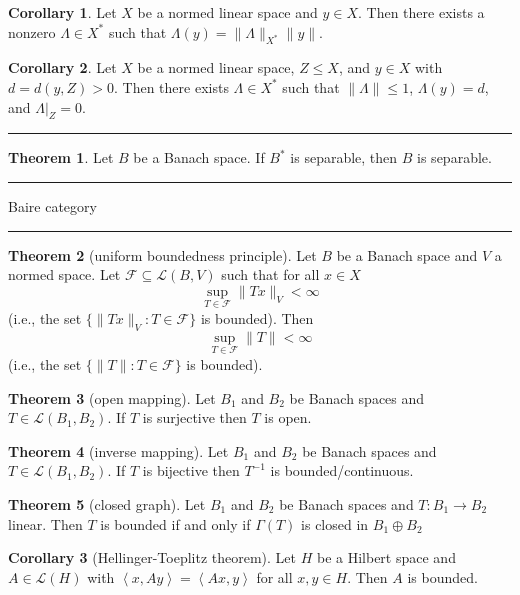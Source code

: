 \documentclass[12pt]{article}
\newcommand{\sepline}{\rule{\textwidth}{0.4pt}}
\theoremstyle{definition}
\newtheorem{theorem}{Theorem}
\newtheorem{corollary}{Corollary}
\newcommand{\LL}{\mathcal{L}}
\newcommand{\FF}{\mathcal{F}}
\newcommand{\<}{\left\langle}
\renewcommand{\>}{\right\rangle}
\newcommand{\seq}{\subseteq}
\begin{document}
\begin{corollary}
    Let $X$ be a normed linear space and $y \in X$.
    Then there exists a nonzero $\Lambda \in X^*$ such that $\Lambda(y) = \|\Lambda\|_{X^*}\|y\|$.
\end{corollary}

\begin{corollary}
    Let $X$ be a normed linear space, $Z \leq X$, and $y \in X$ with $d = d(y, Z) > 0$.
    Then there exists $\Lambda \in X^*$ such that $\|\Lambda\| \leq 1$, $\Lambda(y) = d$, and $\Lambda|_Z = 0$.
\end{corollary}

\sepline

\begin{theorem}
    Let $B$ be a Banach space.
    If $B^*$ is separable, then $B$ is separable.
\end{theorem}

\sepline

Baire category

\sepline

\begin{theorem}[uniform boundedness principle]
    Let $B$ be a Banach space and $V$ a normed space.
    Let $\FF \seq \LL(B, V)$ such that for all $x \in X$
    \[
        \sup_{T \in \FF} \|Tx\|_V < \infty
    \]
    (i.e., the set $\{\|Tx\|_V : T \in \FF\}$ is bounded).
    Then
    \[
        \sup_{T \in \FF} \|T\| < \infty
    \]
    (i.e., the set $\{\|T\| : T \in \FF\}$ is bounded).
\end{theorem}

\begin{theorem}[open mapping]
    Let $B_1$ and $B_2$ be Banach spaces and $T \in \LL(B_1, B_2)$.
    If $T$ is surjective then $T$ is open.
\end{theorem}

\begin{theorem}[inverse mapping]
    Let $B_1$ and $B_2$ be Banach spaces and $T \in \LL(B_1, B_2)$.
    If $T$ is bijective then $T^{-1}$ is bounded/continuous.
\end{theorem}

\begin{theorem}[closed graph]
    Let $B_1$ and $B_2$ be Banach spaces and $T : B_1 \to B_2$ linear.
    Then $T$ is bounded if and only if $\Gamma(T)$ is closed in $B_1 \oplus B_2$
\end{theorem}

\begin{corollary}[Hellinger-Toeplitz theorem]
    Let $H$ be a Hilbert space and $A \in \LL(H)$ with $\<x, Ay\> = \<Ax, y\>$ for all $x, y \in H$.
    Then $A$ is bounded.
\end{corollary}
\end{document}
